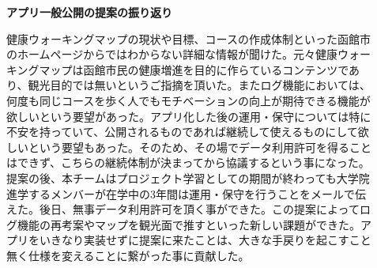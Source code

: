 ﻿\begin{description}

 \item[]
  \textbf{アプリ一般公開の提案の振り返り}\par
 健康ウォーキングマップの現状や目標、コースの作成体制といった函館市のホームページからではわからない詳細な情報が聞けた。元々健康ウォーキングマップは函館市民の健康増進を目的に作らているコンテンツであり、観光目的では無いというご指摘を頂いた。またログ機能においては、何度も同じコースを歩く人でもモチベーションの向上が期待できる機能が欲しいという要望があった。アプリ化した後の運用・保守については特に不安を持っていて、公開されるものであれば継続して使えるものにして欲しいという要望もあった。そのため、その場でデータ利用許可を得ることはできず、こちらの継続体制が決まってから協議するという事になった。提案の後、本チームはプロジェクト学習としての期間が終わっても大学院進学するメンバーが在学中の3年間は運用・保守を行うことをメールで伝えた。後日、無事データ利用許可を頂く事ができた。この提案によってログ機能の再考案やマップを観光面で推すといった新しい課題ができた。アプリをいきなり実装せずに提案に来たことは、大きな手戻りを起こすこと無く仕様を変えることに繋がった事に貢献した。

  \par
\end{description}
